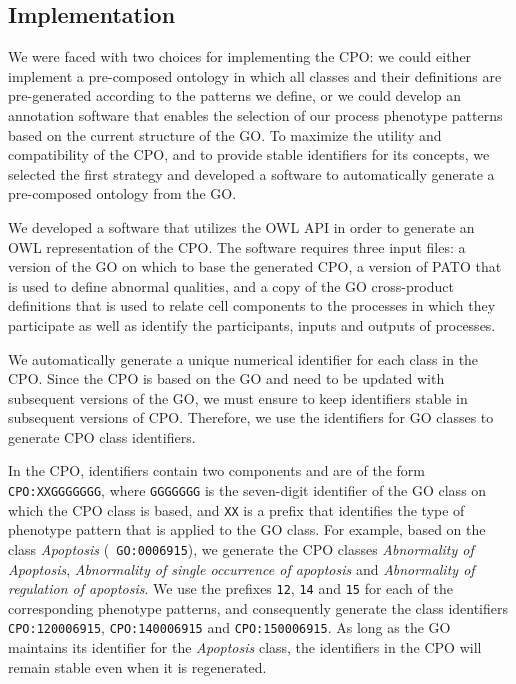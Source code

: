 \documentclass{bioinfo}
\renewcommand{\cite}{\citep}
\begin{document}
\subsection{Implementation}
We were faced with two choices for implementing the CPO: we could
either implement a pre-composed ontology in which all classes and
their definitions are pre-generated according to the patterns we
define, or we could develop an annotation software that enables the
selection of our process phenotype patterns based on the current
structure of the GO.  To maximize the utility and compatibility of the
CPO, and to provide stable identifiers for its concepts, we selected
the first strategy and developed a software to automatically generate
a pre-composed ontology from the GO.

We developed a software that utilizes the OWL API \cite{Horridge2007}
in order to generate an OWL representation of the CPO. The software
requires three input files: a version of the GO on which to base the
generated CPO, a version of PATO that is used to define abnormal
qualities, and a copy of the GO cross-product definitions
\cite{Mungall2010go} that is used to relate cell components to the
processes in which they participate as well as identify the
participants, inputs and outputs of processes.

We automatically generate a unique numerical identifier for each class
in the CPO.  Since the CPO is based on the GO and need to be updated
with subsequent versions of the GO, we must ensure to keep identifiers
stable in subsequent versions of CPO. Therefore, we use the
identifiers for GO classes to generate CPO class identifiers.

In the CPO, identifiers contain two components and are of the form
{\tt CPO:XXGGGGGGG}, where {\tt GGGGGGG} is the seven-digit identifier
of the GO class on which the CPO class is based, and {\tt XX} is a
prefix that identifies the type of phenotype pattern that is applied
to the GO class. For example, based on the class {\em Apoptosis} ({\tt
  GO:0006915}), we generate the CPO classes {\em Abnormality of
  Apoptosis}, {\em Abnormality of single occurrence of apoptosis} and
{\em Abnormality of regulation of apoptosis}.  We use the prefixes
{\tt 12}, {\tt 14} and {\tt 15} for each of the corresponding
phenotype patterns, and consequently generate the class identifiers
{\tt CPO:120006915}, {\tt CPO:140006915} and {\tt CPO:150006915}. As
long as the GO maintains its identifier for the {\em Apoptosis} class,
the identifiers in the CPO will remain stable even when it is
regenerated.
\end{document}
